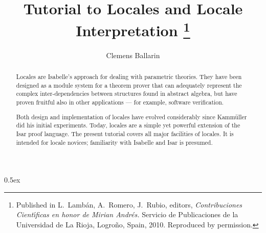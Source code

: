 \documentclass[11pt,a4paper]{article}
\begin{document}
\title{Tutorial to Locales and Locale Interpretation%
\thanks{Published in L.~Lamb\'an, A.~Romero, J.~Rubio, editors, {\em Contribuciones Cient\'{\i}ficas en honor de Mirian Andr\'es.}  Servicio de Publicaciones de la Universidad de La Rioja, Logro\~no, Spain, 2010.  Reproduced by permission.}}
\author{Clemens Ballarin}
\date{}

\maketitle

\begin{abstract}
  Locales are Isabelle's approach for dealing with parametric
  theories.  They have been designed as a module system for a
  theorem prover that can adequately represent the complex
  inter-dependencies between structures found in abstract algebra, but
  have proven fruitful also in other applications --- for example,
  software verification.

  Both design and implementation of locales have evolved considerably
  since Kamm\"uller did his initial experiments.  Today, locales
  are a simple yet powerful extension of the Isar proof language.
  The present tutorial covers all major facilities of locales.  It is
  intended for locale novices; familiarity with Isabelle and Isar is
  presumed.
\end{abstract}

\parindent 0pt\parskip 0.5ex





\end{document}
